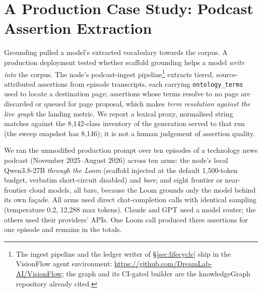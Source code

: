 \documentclass[10pt,twocolumn]{article}
\begin{document}
\section{A Production Case Study: Podcast Assertion Extraction}\label{sec:casestudy}
Grounding pulled a model's extracted vocabulary towards the corpus. A production deployment tested
whether scaffold grounding helps a model \emph{write into} the corpus. The node's podcast-ingest pipeline\footnote{The ingest pipeline and the ledger writer of
\S\ref{sec:lifecycle} ship in the VisionFlow agent environment:
\url{https://github.com/DreamLab-AI/VisionFlow}; the graph and its CI-gated builder are the
knowledgeGraph repository already cited.} extracts tiered, source-attributed assertions from
episode transcripts, each carrying \texttt{ontology\_terms} used to locate a destination page;
assertions whose terms resolve to no page are discarded or queued for page proposal, which makes
\emph{term resolution against the live graph} the landing metric. We report a lexical proxy,
normalised string matches against the 8{,}142-class inventory of the generation served to that run (the sweep snapshot has 8{,}146); it is
not a human judgement of assertion quality.

We ran the unmodified production prompt over ten episodes of a technology news podcast
(November 2025--August 2026) across ten arms: the node's local Qwen3.8-27B \emph{through the
Loom} (scaffold injected at the default 1{,}500-token budget, verbatim short-circuit disabled)
and \emph{bare}; and eight frontier or near-frontier cloud models, all bare, because the Loom
grounds only the model behind its own fa\c{c}ade. All arms used direct chat-completion calls
with identical sampling (temperature 0.2, 12{,}288 max tokens). Claude and GPT used a model
router; the others used their providers' APIs. One Loom call produced three assertions for one
episode and remains in the totals.
\end{document}
